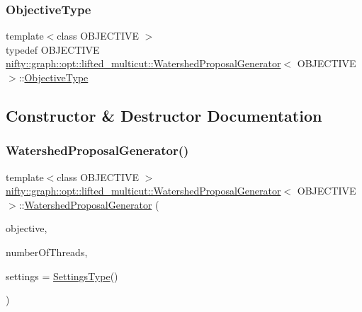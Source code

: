 \subsubsection{\texorpdfstring{Objective\+Type}{ObjectiveType}}
{\footnotesize\ttfamily template$<$class O\+B\+J\+E\+C\+T\+I\+VE $>$ \\
typedef O\+B\+J\+E\+C\+T\+I\+VE \hyperlink{classnifty_1_1graph_1_1opt_1_1lifted__multicut_1_1WatershedProposalGenerator}{nifty\+::graph\+::opt\+::lifted\+\_\+multicut\+::\+Watershed\+Proposal\+Generator}$<$ O\+B\+J\+E\+C\+T\+I\+VE $>$\+::\hyperlink{classnifty_1_1graph_1_1opt_1_1lifted__multicut_1_1WatershedProposalGenerator_a78cd96503ad62ae011fe42ff87692984}{Objective\+Type}}



\subsection{Constructor \& Destructor Documentation}
\mbox{\label{classnifty_1_1graph_1_1opt_1_1lifted__multicut_1_1WatershedProposalGenerator_afc333a56e0951755caf98bbb96833bf7}} 
\subsubsection{\texorpdfstring{Watershed\+Proposal\+Generator()}{WatershedProposalGenerator()}}
{\footnotesize\ttfamily template$<$class O\+B\+J\+E\+C\+T\+I\+VE $>$ \\
\hyperlink{classnifty_1_1graph_1_1opt_1_1lifted__multicut_1_1WatershedProposalGenerator}{nifty\+::graph\+::opt\+::lifted\+\_\+multicut\+::\+Watershed\+Proposal\+Generator}$<$ O\+B\+J\+E\+C\+T\+I\+VE $>$\+::\hyperlink{classnifty_1_1graph_1_1opt_1_1lifted__multicut_1_1WatershedProposalGenerator}{Watershed\+Proposal\+Generator} (\begin{DoxyParamCaption}\item[{const \hyperlink{classnifty_1_1graph_1_1opt_1_1lifted__multicut_1_1WatershedProposalGenerator_a78cd96503ad62ae011fe42ff87692984}{Objective\+Type} \&}]{objective,  }\item[{const size\+\_\+t}]{number\+Of\+Threads,  }\item[{const \hyperlink{structnifty_1_1graph_1_1opt_1_1lifted__multicut_1_1WatershedProposalGenerator_1_1SettingsType}{Settings\+Type} \&}]{settings = {\ttfamily \hyperlink{structnifty_1_1graph_1_1opt_1_1lifted__multicut_1_1WatershedProposalGenerator_1_1SettingsType}{Settings\+Type}()} }\end{DoxyParamCaption})\hspace{0.3cm}{\ttfamily [inline]}}

